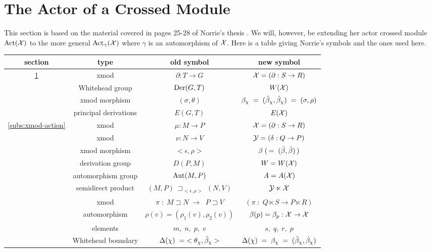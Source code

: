 
\section{The Actor of a Crossed Module} \label{sect:actor}

This section is based on the material covered in pages 25-28 
of Norrie's thesis \cite{norrie-thesis}. 
We will, however, be extending her actor crossed module $\mathrm{Act}(\mathcal{X})$ 
to the more general $\mathrm{Act}_{\gamma}(\mathcal{X})$ where $\gamma$ 
is an automorphism of $\mathcal{X}$. 
Here is a table giving Norrie's symbols and the ones used here.

\vspace{5mm}
\begin{center}
\begin{tabular}{|c|c|c|c|}
\hline
  section  &  type  &  old symbol  &  new symbol  \\
\hline
\ref{sect:actor}
 &  xmod &   $\partial : T \to G$  & $\mathcal{X} = (\partial : S \to R)$   \\
 &  Whitehead group  &  $\mathrm{Der}(G,T)$  &  $W(\mathcal{X})$  \\
 &  xmod morphism    &  $(\sigma,\theta)$  & 
      $\beta_{\chi} \;=\; (\ddot{\beta}_{\chi},\dot{\beta}_{\chi}) \;=\; (\sigma,\rho)$  \\
 & principal derivations  &  $E(G,T)$  &  $E(\mathcal{X})$  \\
\hline
\ref{subs:xmod-action}
 &  xmod &   $\mu : M \to P$    &   $\mathcal{X} = (\partial : S \to R)$    \\
 &  xmod &   $\nu : N \to V$    &   $\mathcal{Y} = (\delta : Q \to P)$    \\
 &  xmod morphism & $<\epsilon,\rho>$  &
                  $\beta\;(\,=\;(\ddot{\beta},\dot{\beta})\,)$ \\
 &  derivation group &   $D(P,M)$           &   $W = W(\mathcal{X})$  \\
 &  automorphism group &   $\mathrm{Aut}(M,P)$        &   $A = A(\mathcal{X})$  \\
 &  semidirect product &   $(M,P)\,\sqsupset_{<\epsilon,\rho>}\,(N,V)$  &  
                  $\mathcal{Y} \ltimes \mathcal{X}$  \\
 &  xmod &   $\pi \;:\; M \sqsupset N \;\to\; \;P \sqsupset V$  &
                  $(\pi \;:\; Q \ltimes S \to P \ltimes R)$      \\
 &  automorphism &   $\rho(v) = (\rho_1(v),\rho_2(v))$  &  
                  $\beta(p) = \beta_p : \mathcal{X} \to \mathcal{X}$ \\
 &  elements &   $m,\;n,\;p,\;v$    &    $s,\;q,\;r,\;p$  \\
 &  Whitehead boundary &   $\Delta(\chi) \;=\; <\theta_{\chi},\ddot{\beta}_{\chi}>$ &
         $\Delta(\chi) \;=\; \beta_{\chi} \;=\; (\ddot{\beta}_{\chi},\dot{\beta}_{\chi})$  \\
\hline
\end{tabular}
\end{center}

